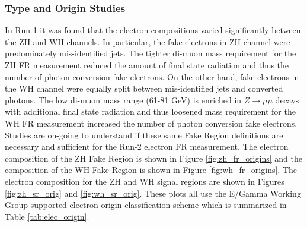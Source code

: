 \subsubsection{Type and Origin Studies}
In Run-1 it was found that the electron compositions varied significantly between the ZH and WH channels. In particular, the fake electrons in ZH channel were predominately mis-identified jets. The tighter di-muon mass requirement for the ZH FR measurement reduced the amount of final state radiation and thus the number of photon conversion fake electrons. On the other hand, fake electrons in the WH channel were equally split between mis-identified jets and converted photons. The low di-muon mass range (61-81 GeV) is enriched in $Z\rightarrow\mu\mu$ decays with additional final state radiation and thus loosened mass requirement for the WH FR measurement increased the number of photon conversion fake electrons.\\

Studies are on-going to understand if these same Fake Region definitions are necessary and sufficient for the Run-2 electron FR measurement. The electron composition of the ZH Fake Region is shown in Figure \ref{fig:zh_fr_origins} and the composition of the WH Fake Region is shown in Figure \ref{fig:wh_fr_origins}. The electron composition for the ZH and WH signal regions are shown in Figures \ref{fig:zh_sr_orig} and \ref{fig:wh_sr_orig}. These plots all use the E/Gamma Working Group supported electron origin classification scheme which is summarized in Table \ref{tab:elec_origin}.\\

